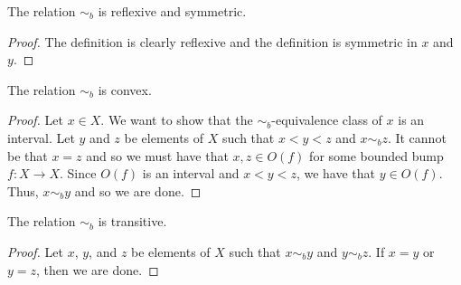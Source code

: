 \begin{theorem}
    \label{refl_symm_bubbleR}
    \leanok
The relation $\sim_b$ is reflexive and symmetric.
\end{theorem}
\begin{proof}\leanok
The definition is clearly reflexive and the definition is symmetric in
$x$ and $y$.
\end{proof}

\begin{theorem}
    \label{convex_bubbleR}
    \leanok
The relation $\sim_b$ is convex.
\end{theorem}
\begin{proof}\leanok
Let $x\in X$. We want to show that the $\sim_b$-equivalence class
of $x$ is an interval.
Let $y$ and $z$ be elements of $X$ such that
$x < y < z$ and $x \sim_b z$. It cannot be that $x = z$
and so we must have that $x,z \in O(f)$ for some bounded bump
$f\colon X \to X$. Since $O(f)$ is an interval and $x < y < z$,
we have that $y \in O(f)$. Thus, $x\sim_b y$ and so we are done.
\end{proof}

\begin{theorem}
    \label{trans_bubbleR}
The relation $\sim_b$ is transitive.
\end{theorem}
\begin{proof}
Let $x$, $y$, and $z$ be elements of $X$ such that
$x \sim_b y$ and $y \sim_b z$. If $x = y$ or $y =z$,
then we are done.
\end{proof}